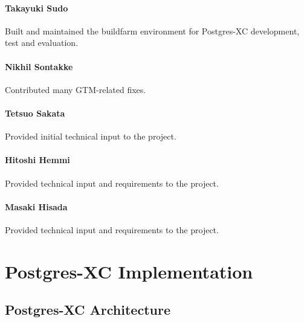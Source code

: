 \documentclass[10pt,a4paper]{book}
\newcommand{\XC}{Postgres-XC}
\begin{document}
\subsection*{Takayuki Sudo}

Built and maintained the buildfarm environment for \XC{} development, test and evaluation.

\subsection*{Nikhil Sontakke}

Contributed many GTM-related fixes.

\subsection*{Tetsuo Sakata}

Provided initial technical input to the project.

\subsection*{Hitoshi Hemmi}

Provided technical input and requirements to the project.

\subsection*{Masaki Hisada}

Provided technical input and requirements to the project.



%
%
\mainmatter

%
%
\newpage
\part{\label{part:analyzing}\XC{} Implementation}



\chapter{\label{chap:architecture}\XC{} Architecture}
\end{document}
